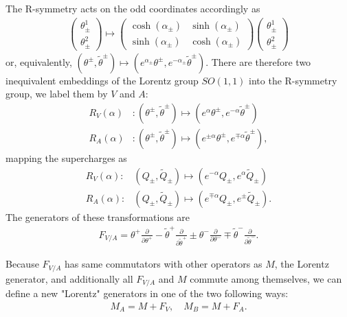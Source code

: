 \documentclass{article}
\newcommand{\p}{\partial}
\newcommand{\tth}{\tl{\theta}}
\def\tl{\tilde}
\theoremstyle{definition}
\theoremstyle{definition}
\theoremstyle{remark}
\begin{document}
The R-symmetry acts on the odd coordinates accordingly as
\begin{align*}
\begin{pmatrix}
\theta^1_\pm \\
\theta^2_\pm	
\end{pmatrix}
\mapsto
\begin{pmatrix}
\cosh(\alpha_\pm) & \sinh(\alpha_\pm) \\
\sinh(\alpha_\pm) & \cosh(\alpha_\pm)
\end{pmatrix}
\begin{pmatrix}
\theta^1_\pm \\
\theta^2_\pm	
\end{pmatrix}
\end{align*}
or, equivalently, $(\theta^\pm,\tth^\pm)\mapsto (e^{\alpha_\pm} \theta^\pm,e^{-\alpha_\pm}\tth^\pm)$. There are therefore two inequivalent embeddings of the Lorentz group $SO(1,1)$ into the R-symmetry group, we label them by $V$ and $A$:
\begin{align*}
R_V(\alpha)&:(\theta^\pm,\tth^\pm)\mapsto (e^\alpha \theta^\pm,e^{-\alpha}\tth^\pm)\\
R_A(\alpha)&:(\theta^\pm,\tth^\pm)\mapsto (e^{\pm \alpha} \theta^\pm,e^{\mp \alpha}\tth^\pm),
\end{align*}
mapping the supercharges as
\begin{align*}
R_V(\alpha):& (Q_\pm,\tl{Q}_\pm)\mapsto (e^{-\alpha}Q_\pm,e^{\alpha}\tl{Q}_\pm)\\
R_A(\alpha):& (Q_\pm,\tl{Q}_\pm)\mapsto (e^{\mp\alpha}Q_\pm,e^{\pm}\tl{Q}_\pm).
\end{align*}
The generators of these transformations are
\begin{align*}
F_{V/A}=\theta^+\frac{\p}{\p\theta^+}-\tth^+\frac{\p}{\p\tth^+}\pm \theta^-\frac{\p}{\p\theta^-}\mp\tth^-\frac{\p}{\p\tth^-}.
\end{align*}

Because $F_{V/A}$ has same commutators with other operators as $M$, the Lorentz generator, and additionally all $F_{V/A}$ and $M$ commute among themselves, we can define a new "Lorentz" generators in one of the two following ways:
\begin{align*}
M_A=M+F_V,\quad M_B=M+F_A.
\end{align*}

\end{document}
